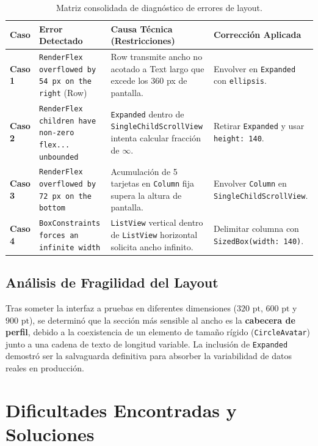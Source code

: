 \documentclass[12pt,a4paper]{article}
\begin{document}
\begin{table}[htbp]
\centering
\small
\begin{tabular}{@{}lp{5.2cm}p{4.8cm}p{3.2cm}@{}}
\toprule
\textbf{Caso} & \textbf{Error Detectado} & \textbf{Causa Técnica (Restricciones)} & \textbf{Corrección Aplicada} \\ \midrule
\textbf{Caso 1} & \texttt{RenderFlex overflowed by 54 px on the right} (Row) & Row transmite ancho no acotado a Text largo que excede los 360 px de pantalla. & Envolver en \texttt{Expanded} con \texttt{ellipsis}. \\ \addlinespace
\textbf{Caso 2} & \texttt{RenderFlex children have non-zero flex... unbounded} & \texttt{Expanded} dentro de \texttt{SingleChildScrollView} intenta calcular fracción de $\infty$. & Retirar \texttt{Expanded} y usar \texttt{height: 140}. \\ \addlinespace
\textbf{Caso 3} & \texttt{RenderFlex overflowed by 72 px on the bottom} & Acumulación de 5 tarjetas en \texttt{Column} fija supera la altura de pantalla. & Envolver \texttt{Column} en \texttt{SingleChildScrollView}. \\ \addlinespace
\textbf{Caso 4} & \texttt{BoxConstraints forces an infinite width} & \texttt{ListView} vertical dentro de \texttt{ListView} horizontal solicita ancho infinito. & Delimitar columna con \texttt{SizedBox(width: 140)}. \\ \bottomrule
\end{tabular}
\caption{Matriz consolidada de diagnóstico de errores de layout.}
\end{table}

\subsection{Análisis de Fragilidad del Layout}
Tras someter la interfaz a pruebas en diferentes dimensiones ($320\text{ pt}$, $600\text{ pt}$ y $900\text{ pt}$), se determinó que la sección más sensible al ancho es la \textbf{cabecera de perfil}, debido a la coexistencia de un elemento de tamaño rígido (\texttt{CircleAvatar}) junto a una cadena de texto de longitud variable. La inclusión de \texttt{Expanded} demostró ser la salvaguarda definitiva para absorber la variabilidad de datos reales en producción.

\section{Dificultades Encontradas y Soluciones}
\end{document}
